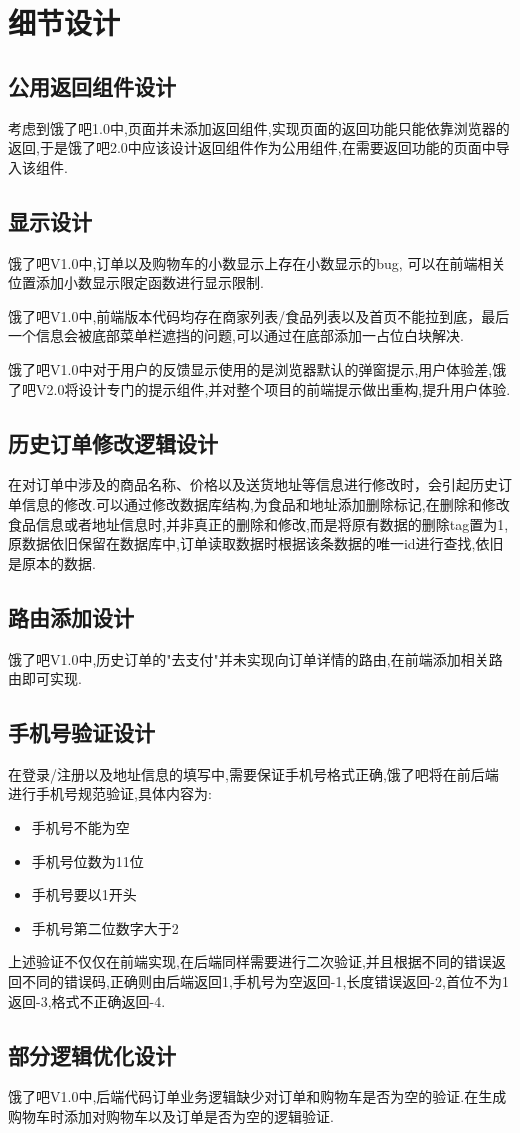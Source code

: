 \section{细节设计}
\subsection{公用返回组件设计}
考虑到饿了吧1.0中,页面并未添加返回组件,实现页面的返回功能只能依靠浏览器的返回,于是饿了吧2.0中应该设计返回组件作为公用组件,在需要返回功能的页面中导入该组件.

\subsection{显示设计}
饿了吧V1.0中,订单以及购物车的小数显示上存在小数显示的bug, 可以在前端相关位置添加小数显示限定函数进行显示限制.

饿了吧V1.0中,前端版本代码均存在商家列表/食品列表以及首页不能拉到底，最后⼀个信息会被底部菜单栏遮挡的问题,可以通过在底部添加一占位白块解决.

饿了吧V1.0中对于用户的反馈显示使用的是浏览器默认的弹窗提示,用户体验差,饿了吧V2.0将设计专门的提示组件,并对整个项目的前端提示做出重构,提升用户体验.

\subsection{历史订单修改逻辑设计}在对订单中涉及的商品名称、价格以及送货地址等信息进行修改时，会引起历史订单信息的修改.可以通过修改数据库结构,为食品和地址添加删除标记,在删除和修改食品信息或者地址信息时,并非真正的删除和修改,而是将原有数据的删除tag置为1,原数据依旧保留在数据库中,订单读取数据时根据该条数据的唯一id进行查找,依旧是原本的数据.

\subsection{路由添加设计}
饿了吧V1.0中,历史订单的"去支付"并未实现向订单详情的路由,在前端添加相关路由即可实现.

\subsection{手机号验证设计}
在登录/注册以及地址信息的填写中,需要保证手机号格式正确,饿了吧将在前后端进行手机号规范验证,具体内容为:
\begin{itemize}
    \item 手机号不能为空
    \item 手机号位数为11位
    \item 手机号要以1开头
    \item 手机号第二位数字大于2
\end{itemize}
上述验证不仅仅在前端实现,在后端同样需要进行二次验证,并且根据不同的错误返回不同的错误码,正确则由后端返回1,手机号为空返回-1,长度错误返回-2,首位不为1返回-3,格式不正确返回-4.

\subsection{部分逻辑优化设计}
饿了吧V1.0中,后端代码订单业务逻辑缺少对订单和购物车是否为空的验证.在生成购物车时添加对购物车以及订单是否为空的逻辑验证.